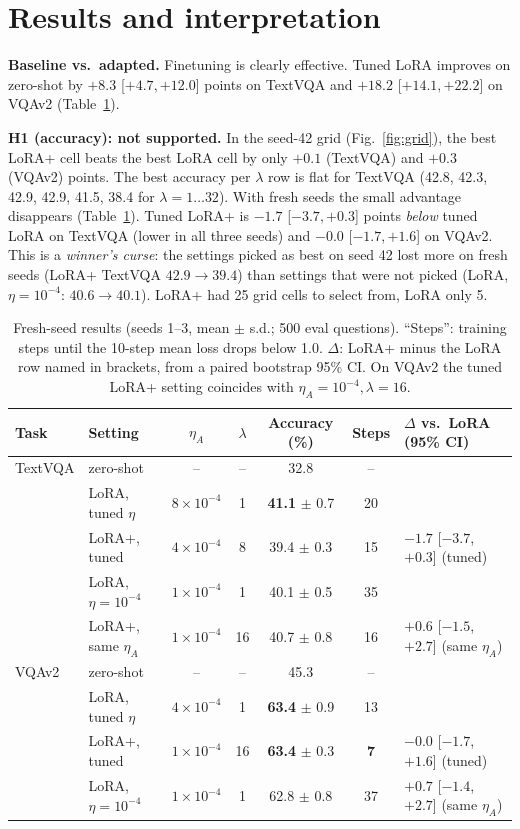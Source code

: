 \documentclass[10pt,a4paper]{article}
\newcommand{\etaA}{\eta_A}
\begin{document}
\section{Results and interpretation}
\textbf{Baseline vs.\ adapted.} Finetuning is clearly effective. Tuned LoRA improves on zero-shot by
$+8.3$ [$+4.7,+12.0$] points on TextVQA and $+18.2$ [$+14.1,+22.2$] on VQAv2 (Table~\ref{tab:main}).

\textbf{H1 (accuracy): not supported.} In the seed-42 grid (Fig.~\ref{fig:grid}), the best LoRA+ cell beats the best LoRA
cell by only $+0.1$ (TextVQA) and $+0.3$ (VQAv2) points. The best accuracy per $\lambda$ row is flat for TextVQA
(42.8, 42.3, 42.9, 42.9, 41.5, 38.4 for $\lambda=1\ldots32$). With fresh seeds the small advantage disappears
(Table~\ref{tab:main}). Tuned LoRA+ is $-1.7$ [$-3.7,+0.3$] points \emph{below} tuned LoRA on TextVQA (lower in all three
seeds) and $-0.0$ [$-1.7,+1.6$] on VQAv2. This is a \emph{winner's curse}: the settings picked as best on seed 42 lost
more on fresh seeds (LoRA+ TextVQA $42.9\to39.4$) than settings that were not picked (LoRA, $\eta=10^{-4}$:
$40.6\to40.1$). LoRA+ had 25 grid cells to select from, LoRA only 5.

\begin{table}[t]
\centering\small
\caption{Fresh-seed results (seeds 1--3, mean $\pm$ s.d.; 500 eval questions). ``Steps'': training steps until the
10-step mean loss drops below 1.0. $\Delta$: LoRA+ minus the LoRA row named in brackets, from a paired bootstrap
95\% CI. On VQAv2 the tuned LoRA+ setting coincides with $\etaA=10^{-4},\lambda=16$.}
\label{tab:main}
\setlength{\tabcolsep}{5pt}
\begin{tabular}{@{}llccccl@{}}
\toprule
Task & Setting & $\etaA$ & $\lambda$ & Accuracy (\%) & Steps & $\Delta$ vs.\ LoRA (95\% CI) \\
\midrule
TextVQA & zero-shot & -- & -- & 32.8 & -- & \\
 & LoRA, tuned $\eta$ & $8\!\times\!10^{-4}$ & 1 & \textbf{41.1} $\pm$ 0.7 & 20 & \\
 & LoRA+, tuned & $4\!\times\!10^{-4}$ & 8 & 39.4 $\pm$ 0.3 & 15 & $-1.7$ [$-3.7$, $+0.3$] (tuned) \\
 & LoRA, $\eta=10^{-4}$ & $1\!\times\!10^{-4}$ & 1 & 40.1 $\pm$ 0.5 & 35 & \\
 & LoRA+, same $\etaA$ & $1\!\times\!10^{-4}$ & 16 & 40.7 $\pm$ 0.8 & 16 & $+0.6$ [$-1.5$, $+2.7$] (same $\etaA$) \\
\midrule
VQAv2 & zero-shot & -- & -- & 45.3 & -- & \\
 & LoRA, tuned $\eta$ & $4\!\times\!10^{-4}$ & 1 & \textbf{63.4} $\pm$ 0.9 & 13 & \\
 & LoRA+, tuned & $1\!\times\!10^{-4}$ & 16 & \textbf{63.4} $\pm$ 0.3 & \textbf{7} & $-0.0$ [$-1.7$, $+1.6$] (tuned) \\
 & LoRA, $\eta=10^{-4}$ & $1\!\times\!10^{-4}$ & 1 & 62.8 $\pm$ 0.8 & 37 & $+0.7$ [$-1.4$, $+2.7$] (same $\etaA$) \\
\bottomrule
\end{tabular}
\end{table}
\end{document}
